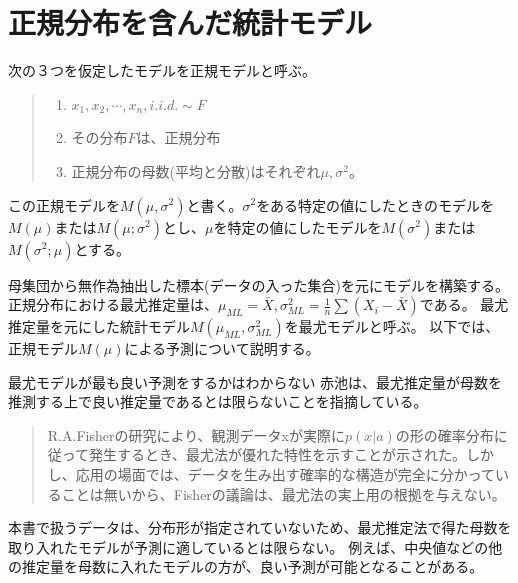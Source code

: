 \section{正規分布を含んだ統計モデル}
次の３つを仮定したモデルを正規モデルと呼ぶ。
\begin{quote}
    \begin{enumerate}[(1)]
    \item $x_1,x_2,\cdots,x_n, i.i.d. \sim F$
    \item その分布$F$は、正規分布
    \item 正規分布の母数(平均と分散)はそれぞれ$\mu,\sigma^2$。
    \end{enumerate}
\end{quote}
この正規モデルを$M(\mu,\sigma^2)$と書く。$\sigma^2$をある特定の値にしたときのモデルを$M(\mu)$または$M(\mu;\sigma^2)$とし、$\mu$を特定の値にしたモデルを$M(\sigma^2)$または$M(\sigma^2;\mu)$とする。

母集団から無作為抽出した標本(データの入った集合)を元にモデルを構築する。正規分布における最尤推定量は、$\mu_{ML}=\bar{X},\sigma^2_{ML}=\frac{1}{n}\sum(X_i-\bar{X})$である。
最尤推定量を元にした統計モデル$M(\mu_{ML},\sigma^2_{ML})$を最尤モデルと呼ぶ。
以下では、正規モデル$M(\mu)$による予測について説明する。

\begin{SMbox}{最尤モデルが最も良い予測をするかはわからない}
赤池は、最尤推定量が母数を推測する上で良い推定量であるとは限らないことを指摘している\cite{1570854174583769344}。
 \begin{quote}
  R.A.Fisherの研究により、観測データxが実際に$p(x|a)$の形の確率分布に従って発生するとき、最尤法が優れた特性を示すことが示された。しかし、応用の場面では、データを生み出す確率的な構造が完全に分かっていることは無いから、Fisherの議論は、最尤法の実上用の根拠を与えない。
 \end{quote}

 本書で扱うデータは、分布形が指定されていないため、最尤推定法で得た母数を取り入れたモデルが予測に適しているとは限らない。
 例えば、中央値などの他の推定量を母数に入れたモデルの方が、良い予測が可能となることがある。

\end{SMbox}



